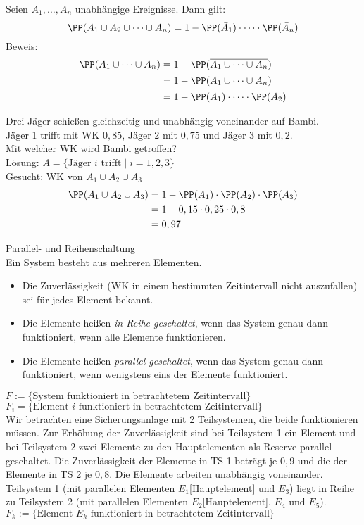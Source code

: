  Seien $A_1, \dots, A_n$ unabhängige Ereignisse. Dann gilt:
$$\PP(A_1 \cup A_2 \cup \dots \cup A_n) = 1 - \PP(\bar A_1) \cdot \dots \cdot \PP(\bar A_n)$$
Beweis: 
\begin{align*}
\PP(A_1 \cup \dots \cup A_n) &= 1 - \PP(\overline{A_1 \cup \dots \cup A_n})\\
&= 1 - \PP(\bar A_1 \cup \dots \cup \bar A_n)\\
&= 1- \PP(\bar A_1) \cdot \dots \cdot \PP(\bar A_2)
\end{align*}

 Drei Jäger schießen gleichzeitig und unabhängig voneinander auf Bambi.\\
Jäger 1 trifft mit WK $0,85$, Jäger 2 mit $0,75$ und Jäger 3 mit $0,2$.\\
Mit welcher WK wird Bambi getroffen?\\
Lösung: $A=\{\text{Jäger }i\text{ trifft}\;|\; i =1,2,3\}$\\
Gesucht: WK von $A_1 \cup A_2 \cup A_3$ 
\begin{align*}
\PP(A_1 \cup A_2 \cup A_3) &= 1 - \PP(\bar A_1) \cdot \PP(\bar A_2) \cdot \PP(\bar A_3)\\
&= 1 - 0,15\cdot 0,25 \cdot 0,8\\
&= 0,97
\end{align*}

 Parallel- und Reihenschaltung\\
Ein System besteht aus mehreren Elementen.
\begin{itemize}
\item Die Zuverlässigkeit (WK in einem bestimmten Zeitintervall nicht auszufallen) sei für jedes Element bekannt.
\item Die Elemente heißen \emph{in Reihe geschaltet}, wenn das System genau dann funktioniert, wenn alle Elemente funktionieren.
\item Die Elemente heißen \emph{parallel geschaltet}, wenn das System genau dann funktioniert, wenn wenigstens eins der Elemente funktioniert.
\end{itemize}
$F:=\{\text{System funktioniert in betrachtetem Zeitintervall}\}$\\
$F_i= \{\text{Element } i\text{ funktioniert in betrachtetem Zeitintervall}\}$\\
Wir betrachten eine Sicherungsanlage mit 2 Teilsystemen, die beide funktionieren müssen. Zur Erhöhung der Zuverlässigkeit sind bei Teilsystem 1 ein Element und bei Teilsystem 2 zwei Elemente zu den Hauptelementen als Reserve parallel geschaltet. Die Zuverlässigkeit der Elemente in TS 1 beträgt je $0,9$ und die der Elemente in TS 2 je $0,8$. Die Elemente arbeiten unabhängig voneinander.\\
Teilsystem 1 (mit parallelen Elementen $E_1$[Hauptelement] und $E_3$) liegt in Reihe zu Teilsystem 2 (mit parallelen Elementen $E_2$[Hauptelement], $E_4$ und $E_5$).\\
$F_k:= \{ \text{Element }E_k\text{ funktioniert in betrachtetem Zeitintervall}\}$

